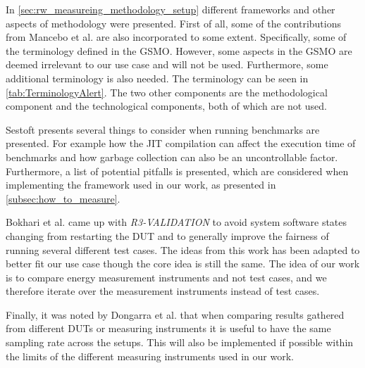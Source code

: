 
In \cref{sec:rw_measureing_methodology_setup} different frameworks and other aspects of methodology were presented. First of all, some of the contributions from Mancebo et al. \cite{GarciaFEETINGS} are also incorporated to some extent. Specifically, some of the terminology defined in the GSMO. However, some aspects in the GSMO are deemed irrelevant to our use case and will not be used. Furthermore, some additional terminology is also needed. The terminology can be seen in \cref{tab:TerminologyAlert}. The two other components are the methodological component and the technological components, both of which are not used.

Sestoft\cite{sestoft2013microbenchmarks} presents several things to consider when running benchmarks are presented. For example how the JIT compilation can affect the execution time of benchmarks and how garbage collection can also be an uncontrollable factor. Furthermore, a list of potential pitfalls is presented, which are considered when implementing the framework used in our work, as presented in \cref{subsec:how_to_measure}.

Bokhari et al.\cite{Bokhari2020r3} came up with \textit{R3-VALIDATION} to avoid system software states changing from restarting the DUT and to generally improve the fairness of running several different test cases. The ideas from this work has been adapted to better fit our use case though the core idea is still the same. The idea of our work is to compare energy measurement instruments and not test cases, and we therefore iterate over the measurement instruments instead of test cases.

Finally, it was noted by Dongarra et al.\cite{Dongarra2012} that when comparing results gathered from different DUTs or measuring instruments it is useful to have the same sampling rate across the setups. This will also be implemented if possible within the limits of the different measuring instruments used in our work.

